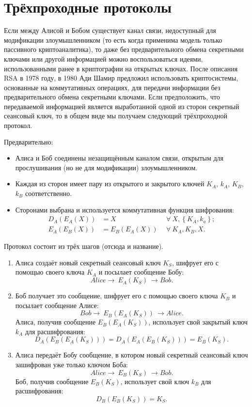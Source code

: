 \section{Трёхпроходные протоколы}

Если между Алисой и Бобом существует канал связи, недоступный для модификации злоумышленником (то есть когда применима модель только пассивного криптоаналитика), то даже без предварительного обмена секретными ключами или другой информацией можно воспользоваться идеями, использованными ранее в криптографии на открытых ключах. После описания RSA в 1978 году, в 1980 Ади Шамир предложил использовать криптосистемы, основанные на коммутативных операциях, для передачи информации без предварительного обмена секретными ключами. Если предположить, что передаваемой информацией является выработанной одной из сторон секретный сеансовый ключ, то в общем виде мы получаем следующий трёхпроходной протокол.

Предварительно:

\begin{itemize}
	\item Алиса и Боб соединены незащищённым каналом связи, открытым для прослушивания (но не для модификации) злоумышленником.
	\item Каждая из сторон имеет пару из открытого и закрытого ключей $K_A$, $k_A$, $K_B$, $k_B$ соответственно.
	\item Сторонами выбрана и используется коммутативная функция шифрования:
	\begin{align*}
		D_{A} \left( E_{A} \left( X \right) \right)	&= X		& ~~\forall ~ X, \left\{ K_A, k_a \right\}; \\
		E_{A} \left( E_{B} \left( X \right) \right)	&= E_B \left( E_A \left( X \right) \right) & ~~\forall ~ K_A, K_B, X.
	\end{align*}
\end{itemize}

Протокол состоит из трёх шагов (отсюда и название).
\begin{enumerate}
    \item Алиса создаёт новый секретный сеансовый ключ $K_S$, шифрует его с помощью своего ключа $K_A$ и посылает сообщение Бобу:
        \[ Alice \rightarrow ~ E_A \left( K_S \right) ~ \rightarrow Bob. \]
    \item Боб получает это сообщение, шифрует его с помощью своего ключа $K_B$ и посылает сообщение Алисе:
        \[ Bob \rightarrow ~ E_B \left( E_A \left( K_S \right) \right) ~ \rightarrow Alice. \]
    Алиса, получив сообщение $E_B \left( E_A \left( K_S \right) \right)$, использует свой закрытый ключ $k_A$ для расшифрования:
	\[ D_A \left( E_B \left( E_A \left( K_S \right) \right) \right) = D_A \left( E_A \left( E_B \left( K_S \right) \right) \right) = E_B \left( K_S \right). \]
    \item Алиса передаёт Бобу сообщение, в котором новый секретный сеансовый ключ зашифрован уже только ключом Боба:
        \[ Alice \rightarrow ~ E_B \left( K_S \right) ~ \rightarrow Bob. \]
    Боб, получив сообщение $E_B \left( K_S \right)$, использует свой ключ $k_B$ для расшифрования:
	\[ D_B \left( E_B \left( K_S \right) \right) = K_S. \]
\end{enumerate}

